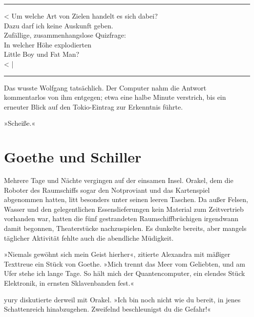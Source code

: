 \noindent \parbox{\textwidth}{ \vspace{3ex} \hrule \vspace{3ex}

    \begin{tiny}
    \begin{ttfamily}

\noindent \textless{} Um welche Art von Zielen handelt es sich dabei?\\
\noindent Dazu darf ich keine Auskunft geben.\\
\noindent Zufällige, zusammenhangslose Quizfrage:\\
\noindent In welcher Höhe explodierten\\
\noindent Little Boy und Fat Man?\\
\noindent \textless{} |

    \end{ttfamily}
    \end{tiny}

\vspace{3ex} \hrule \vspace{3ex} }

Das wusste Wolfgang tatsächlich. Der Computer nahm die Antwort kommentarlos von ihm entgegen; etwa eine halbe Minute verstrich, bis ein erneuter Blick auf den Tokio-Eintrag zur Erkenntnis führte.

»Scheiße.«


\chapter{Goethe und Schiller}

Mehrere Tage und Nächte vergingen auf der einsamen Insel. Orakel, dem die Roboter des Raumschiffs sogar den Notproviant und das Kartenspiel abgenommen hatten, litt besonders unter seinen leeren Taschen. Da außer Felsen, Wasser und den gelegentlichen Essenslieferungen kein Material zum Zeitvertrieb vorhanden war, hatten die fünf gestrandeten Raumschiffbrüchigen irgendwann damit begonnen, Theaterstücke nachzuspielen. Es dunkelte bereits, aber mangels täglicher Aktivität fehlte auch die abendliche Müdigkeit.

»Niemals gewöhnt sich mein Geist hierher«, zitierte Alexandra mit mäßiger Texttreue ein Stück von Goethe. »Mich trennt das Meer vom Geliebten, und am Ufer stehe ich lange Tage. So hält mich der Quantencomputer, ein elendes Stück Elektronik, in ernsten Sklavenbanden fest.«

yury diskutierte derweil mit Orakel. »Ich bin noch nicht wie du bereit, in jenes Schattenreich hinabzugehen. Zweifelnd beschleunigst du die Gefahr!«

